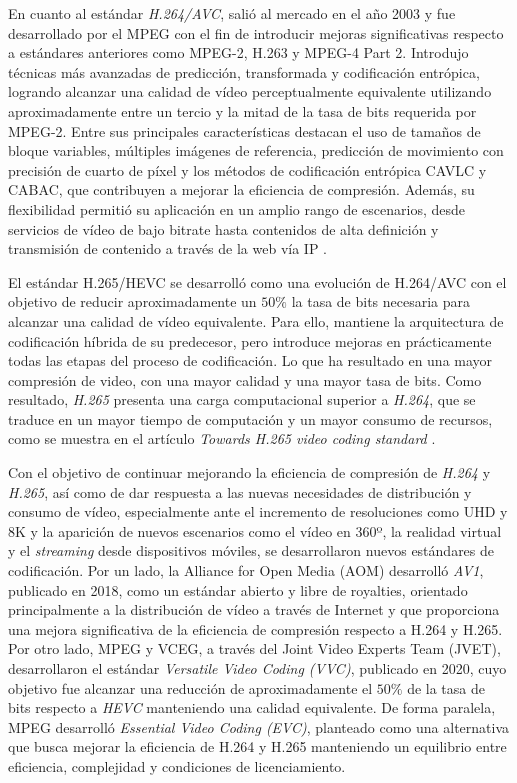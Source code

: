  En cuanto al estándar \textit{H.264/AVC}, salió al mercado en el año 2003 y fue desarrollado por el MPEG con el fin de introducir mejoras significativas respecto a estándares anteriores como MPEG-2, H.263 y MPEG-4 Part 2. Introdujo técnicas más avanzadas de predicción, transformada y codificación entrópica, logrando alcanzar una calidad de vídeo perceptualmente equivalente utilizando aproximadamente entre un tercio y la mitad de la tasa de bits requerida por MPEG-2. Entre sus principales características destacan el uso de tamaños de bloque variables, múltiples imágenes de referencia, predicción de movimiento con precisión de cuarto de píxel y los métodos de codificación entrópica CAVLC y CABAC, que contribuyen a mejorar la eficiencia de compresión. Además, su flexibilidad permitió su aplicación en un amplio rango de escenarios, desde servicios de vídeo de bajo bitrate hasta contenidos de alta definición y transmisión de contenido a través de la web vía IP \cite{h264-survery}.

 El estándar H.265/HEVC se desarrolló como una evolución de H.264/AVC con el objetivo de reducir aproximadamente un $50\%$ la tasa de bits necesaria para alcanzar una calidad de vídeo equivalente. Para ello, mantiene la arquitectura de codificación híbrida de su predecesor, pero introduce mejoras en prácticamente todas las etapas del proceso de codificación. Lo que ha resultado en una mayor compresión de video, con una mayor calidad y una mayor tasa de bits. Como resultado, \textit{H.265} presenta una carga computacional superior a \textit{H.264}, que se traduce en un mayor tiempo de computación y un mayor consumo de recursos, como se muestra en el artículo \textit{Towards H.265 video coding standard} \cite{h265-survery}. 

 Con el objetivo de continuar mejorando la eficiencia de compresión de \textit{H.264} y \textit{H.265}, así como de dar respuesta a las nuevas necesidades de distribución y consumo de vídeo, especialmente ante el incremento de resoluciones como UHD y 8K y la aparición de nuevos escenarios como el vídeo en 360º, la realidad virtual y el \textit{streaming} desde dispositivos móviles, se desarrollaron nuevos estándares de codificación. Por un lado, la Alliance for Open Media (AOM) desarrolló \textit{AV1}, publicado en 2018, como un estándar abierto y libre de royalties, orientado principalmente a la distribución de vídeo a través de Internet y que proporciona una mejora significativa de la eficiencia de compresión respecto a H.264 y H.265. Por otro lado, MPEG y VCEG, a través del Joint Video Experts Team (JVET), desarrollaron el estándar \textit{Versatile Video Coding (VVC)}, publicado en 2020, cuyo objetivo fue alcanzar una reducción de aproximadamente el $50\%$ de la tasa de bits respecto a \textit{HEVC} manteniendo una calidad equivalente. De forma paralela, MPEG desarrolló \textit{Essential Video Coding (EVC)}, planteado como una alternativa que busca mejorar la eficiencia de H.264 y H.265 manteniendo un equilibrio entre eficiencia, complejidad y condiciones de licenciamiento. 


